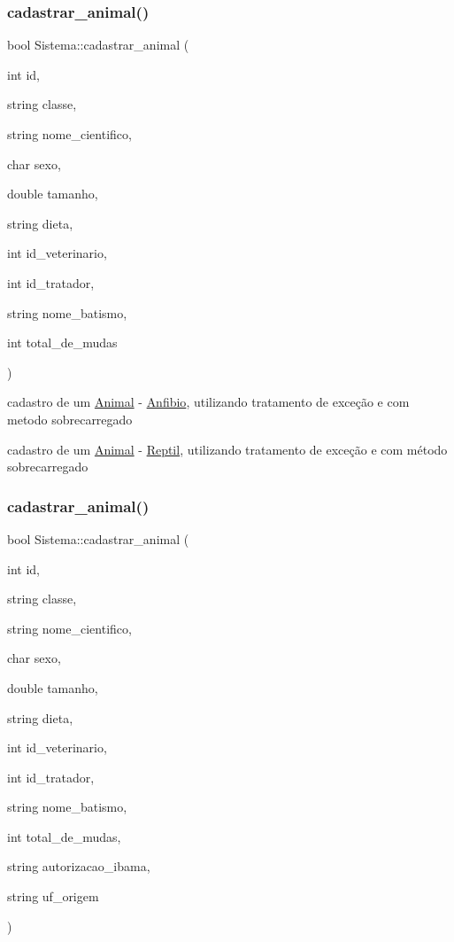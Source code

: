 \subsubsection{\texorpdfstring{cadastrar\_animal()}{cadastrar\_animal()}\hspace{0.1cm}{\footnotesize\ttfamily [1/12]}}
{\footnotesize\ttfamily bool Sistema\+::cadastrar\+\_\+animal (\begin{DoxyParamCaption}\item[{int}]{id,  }\item[{string}]{classe,  }\item[{string}]{nome\+\_\+cientifico,  }\item[{char}]{sexo,  }\item[{double}]{tamanho,  }\item[{string}]{dieta,  }\item[{int}]{id\+\_\+veterinario,  }\item[{int}]{id\+\_\+tratador,  }\item[{string}]{nome\+\_\+batismo,  }\item[{int}]{total\+\_\+de\+\_\+mudas }\end{DoxyParamCaption})}



cadastro de um \mbox{\hyperlink{class_animal}{Animal}} -\/ \mbox{\hyperlink{class_anfibio}{Anfibio}}, utilizando tratamento de exceção e com metodo sobrecarregado 

cadastro de um \mbox{\hyperlink{class_animal}{Animal}} -\/ \mbox{\hyperlink{class_reptil}{Reptil}}, utilizando tratamento de exceção e com método sobrecarregado \mbox{\label{class_sistema_a3c9d2decd44859a8f8eab34859539718}} 
\subsubsection{\texorpdfstring{cadastrar\_animal()}{cadastrar\_animal()}\hspace{0.1cm}{\footnotesize\ttfamily [2/12]}}
{\footnotesize\ttfamily bool Sistema\+::cadastrar\+\_\+animal (\begin{DoxyParamCaption}\item[{int}]{id,  }\item[{string}]{classe,  }\item[{string}]{nome\+\_\+cientifico,  }\item[{char}]{sexo,  }\item[{double}]{tamanho,  }\item[{string}]{dieta,  }\item[{int}]{id\+\_\+veterinario,  }\item[{int}]{id\+\_\+tratador,  }\item[{string}]{nome\+\_\+batismo,  }\item[{int}]{total\+\_\+de\+\_\+mudas,  }\item[{string}]{autorizacao\+\_\+ibama,  }\item[{string}]{uf\+\_\+origem }\end{DoxyParamCaption})}



